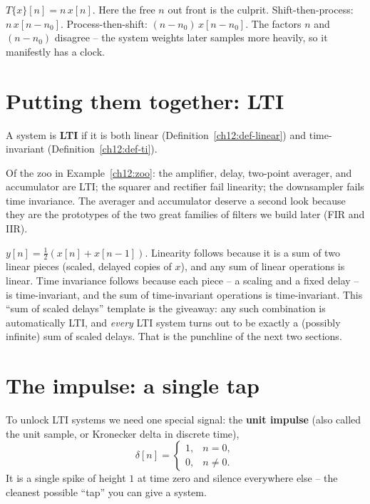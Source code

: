 \begin{example}
$T\{x\}[n] = n\,x[n]$. Here the free $n$ out front is the culprit.
Shift-then-process: $n\,x[n-n_0]$. Process-then-shift: $(n-n_0)\,x[n-n_0]$.
The factors $n$ and $(n-n_0)$ disagree -- the system weights later samples more
heavily, so it manifestly has a clock.
\end{example}

\section{Putting them together: LTI}
\label{ch12:lti}

\begin{definition}
\label{ch12:def-lti}
A system is \textbf{LTI} if it is both linear (Definition~\ref{ch12:def-linear})
and time-invariant (Definition~\ref{ch12:def-ti}).
\end{definition}

Of the zoo in Example~\ref{ch12:zoo}: the amplifier, delay, two-point averager,
and accumulator are LTI; the squarer and rectifier fail linearity; the
downsampler fails time invariance. The averager and accumulator deserve a second
look because they are the prototypes of the two great families of filters we
build later (FIR and IIR).

\begin{example}
$y[n] = \tfrac12(x[n] + x[n-1])$. Linearity follows because it is a sum of two
linear pieces (scaled, delayed copies of $x$), and any sum of linear operations
is linear. Time invariance follows because each piece -- a scaling and a fixed
delay -- is time-invariant, and the sum of time-invariant operations is
time-invariant. This ``sum of scaled delays'' template is the giveaway: any such
combination is automatically LTI, and \emph{every} LTI system turns out to be
exactly a (possibly infinite) sum of scaled delays. That is the punchline of the
next two sections.
\end{example}

\section{The impulse: a single tap}
\label{ch12:impulse}

To unlock LTI systems we need one special signal: the \textbf{unit impulse}
(also called the unit sample, or Kronecker delta in discrete time),
\[
  \delta[n] = \begin{cases} 1, & n = 0,\\ 0, & n \neq 0. \end{cases}
\]
It is a single spike of height $1$ at time zero and silence everywhere else --
the cleanest possible ``tap'' you can give a system.


